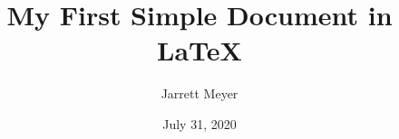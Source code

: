 \documentclass[12pt, letterpaper]{article}
\title{My First Simple Document in \LaTeX}
\author{Jarrett Meyer}
\date{July 31, 2020}
\begin{document}
\maketitle

\lipsum
\end{document}
